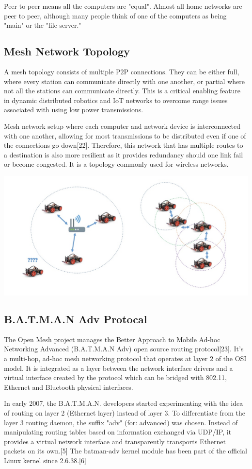 \documentclass{mproj}
\begin{document}
Peer to peer means all the computers are "equal". Almost all home networks are peer to peer, although many people think of one of the computers as being "main" or the "file server."

\subsection{Mesh Network Topology}
A mesh topology consists of multiple P2P connections. They can be either full, where every station can communicate directly with one another, or partial where not all the stations can communicate directly. This is a critical enabling feature in dynamic distributed robotics and IoT networks to overcome range issues associated with using low power transmissions.

Mesh network setup where each computer and network device is interconnected with one another, allowing for most transmissions to be distributed even if one of the connections go down[22]. Therefore, this network that has multiple routes to a destination is also more resilient as it provides redundancy should one link fail or become congested. It is a topology commonly used for wireless networks.

\includegraphics[width = .7\textwidth]{b.jpg}

\subsection{B.A.T.M.A.N Adv Protocal}

The Open Mesh project manages the Better Approach to Mobile Ad-hoc Networking Advanced (B.A.T.M.A.N Adv) open source routing protocol[23]. It’s a multi-hop, ad-hoc mesh networking protocol that operates at layer 2 of the OSI model. It is integrated as a layer between the network interface drivers and a virtual interface created by the protocol which can be bridged with 802.11, Ethernet and Bluetooth physical interfaces.

In early 2007, the B.A.T.M.A.N. developers started experimenting with the idea of routing on layer 2 (Ethernet layer) instead of layer 3. To differentiate from the layer 3 routing daemon, the suffix "adv" (for: advanced) was chosen. Instead of manipulating routing tables based on information exchanged via UDP/IP, it provides a virtual network interface and transparently transports Ethernet packets on its own.[5] The batman-adv kernel module has been part of the official Linux kernel since 2.6.38.[6]
\end{document}
